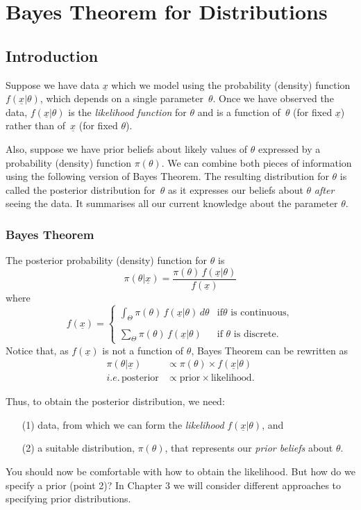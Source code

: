\chapter{Bayes Theorem for Distributions}
\section{Introduction}
Suppose we have data $\underline{x}$ which we model using the probability
(density) function $f(\underline{x}|\theta)$, which depends on a single
parameter~$\theta$. Once we have observed the data, $f(\underline{x}|\theta)$
is the \textit{likelihood function} for $\theta$ and is a function
of~$\theta$ (for fixed $\underline{x}$) rather than of~$\underline{x}$ (for fixed
$\theta$).

Also, suppose we have prior beliefs about likely values of $\theta$
expressed by a probability (density) function $\pi(\theta)$. We can
combine both pieces of information using the following version of
Bayes Theorem. The resulting distribution for $\theta$ is called the
posterior distribution for~$\theta$ as it expresses our beliefs about
$\theta$ {\it after} seeing the data. It summarises all our current
knowledge about the parameter $\theta$.

\subsection*{Bayes Theorem}
The posterior probability (density) function for $\theta$ is
$$\pi(\theta|\underline{x})=\frac{\pi(\theta)\,f(\underline{x}|\theta)}{f(\underline{x})} 
$$
where
$$
f(\underline{x})=
\begin{cases}
\int_\Theta\pi(\theta)\,f(\underline{x}|\theta)\,d\theta & \text{if
$\theta$ is continuous}, \\ \\
\sum_\Theta\pi(\theta)\,f(\underline{x}|\theta) & \text{if $\theta$ is discrete}.
\end{cases} 
$$
Notice that, as $f(\underline{x})$ is not a function of
$\theta$, Bayes Theorem can be rewritten as
\begin{align*}
\pi(\theta|\underline{x})&\propto \pi(\theta)\times f(\underline{x}|\theta) \\
i.e. \, \text{posterior}&\propto\text{prior}\times\text{likelihood}.
\end{align*}

\newpage

\noindent Thus, to obtain the posterior distribution, we need:
\begin{itemize}
\item [(1)] data, from which we can form the \emph{likelihood} $f(\underline{x}|\theta)$, and 
\item [(2)] a suitable distribution, $\pi(\theta)$, that represents our \emph{prior beliefs} about $\theta$.  
\end{itemize}
You should now be comfortable with how to obtain the likelihood. But how do we specify a prior (point 2)? In Chapter 3 we will consider different approaches to specifying prior distributions.

